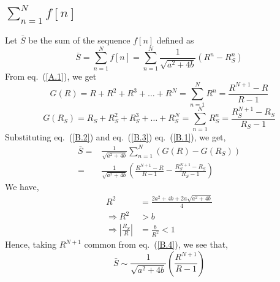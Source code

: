 \begin{multicols}{2}
\subsection*{ $\displaystyle{\sum_{n=1}^Nf[n]}$ \label{sub-app-B-1}}
Let $\bar{S}$ be the sum of the sequence $f[n]$ defined as
\begin{equation}
\bar{S} =\displaystyle{\sum_{n=1}^N f[n]} = \displaystyle{\sum_{n=1}^N \frac{1}{\sqrt{a^2 + 4b}}(R^n - R_S^n)}\tag{B.1}\label{B.1}
\end{equation}
From eq.~(\ref{A.1}), we get
\begin{equation}
G(R) = R + R^2 + R^3 + \ldots + R^N =\displaystyle{ \sum_{n=1}^N R^n = \frac{R^{N+1}- R}{R-1}}\tag{B.2}\label{B.2}
\end{equation}
\begin{equation}
G(R_S) = R_S + R_S^2 + R_S^3 + \ldots + R_S^N = \displaystyle{\sum_{n=1}^N R_S^n = \frac{R_S^{N+1}- R_S}{R_S-1}}\tag{B.3}\label{B.3}
\end{equation}
Substituting eq.~(\ref{B.2}) and eq.~(\ref{B.3}) eq.~(\ref{B.1}), we get,
\begin{align}
\bar{S} =& \displaystyle{\frac{1}{\sqrt{a^2 + 4b}}}\displaystyle{\sum_{n=1}^N{(G(R) -  G(R_S))}}\nonumber\\
  = & \displaystyle{\frac{1}{\sqrt{a^2 + 4b}}} \left(\displaystyle{\frac{R^{N+1}- R}{R-1}} - \displaystyle{\frac{R_S^{N+1}- R_S}{R_S-1}}\right)\tag{B.4}\label{B.4}
\end{align}
We have,
\begin{align}
\nonumber R^2 &= \displaystyle{\frac{2a^2+4b+2a\sqrt{a^2+4b}}{4}}\\ 
\nonumber \Rightarrow R^2 &> b\\
\Rightarrow |\frac{R_S}{R}| &= \frac{b}{R^2} < 1\tag{B.5}\label{B.5}
\end{align}
Hence, taking $R^{N+1}$ common from eq.~(\ref{B.4}), we see that,
\begin{equation}
 \bar{S} \sim \displaystyle{\frac{1}{\sqrt{a^2 + 4b}}}\left( \frac{R^{N+1}}{R-1}\right)\tag{B.6}\label{B.6}
\end{equation}


\end{multicols}
